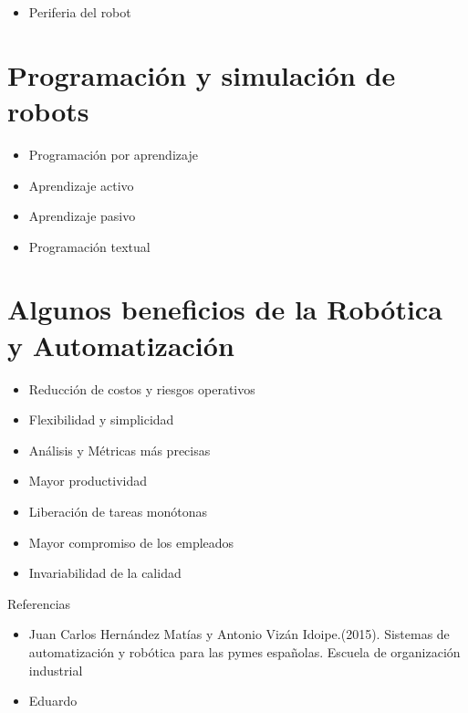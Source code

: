 \documentclass[12pt, Letterpaper]{article}
\begin{document}
\begin{landscape}
\begin{itemize}
    \item {\large Periferia del robot}
\end{itemize}


\section{Programación y simulación de robots}
\begin{itemize}
    \item {\large Programación por aprendizaje}
    \item {\large Aprendizaje activo}
    \item {\large Aprendizaje pasivo}
    \item {\large Programación textual}
    
\end{itemize}


 \section{Algunos beneficios de la Robótica y Automatización}
\begin{itemize}
    \item {\large Reducción de costos y riesgos operativos}
    \item {\large Flexibilidad y simplicidad}
    \item {\large Análisis y Métricas más precisas}
    \item {\large Mayor productividad}
    \item {\large Liberación de tareas monótonas}
    \item {\large Mayor compromiso de los empleados}
    \item {\large Invariabilidad de la calidad}
\end{itemize}


\vspace{1cm}

\begin{center}
 
         {\Huge Referencias}
     \end{center} 

     \begin{itemize}
         \item {\Large Juan Carlos Hernández Matías y Antonio Vizán Idoipe.(2015). Sistemas de automatización y robótica para las pymes españolas. Escuela de organización industrial}

\vspace{0.7cm}

      \item {\Large Eduardo }
   \end{itemize}

\end{landscape}
\end{document}
